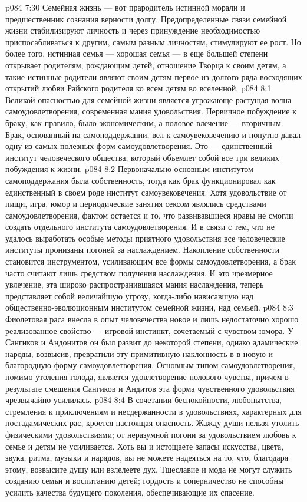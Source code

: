\vs p084 7:30 Семейная жизнь --- вот прародитель истинной морали и предшественник сознания верности долгу. Предопределенные связи семейной жизни стабилизируют личность и через принуждение необходимостью приспосабливаться к другим, самым разным личностям, стимулируют ее рост. Но более того, истинная семья --- хорошая семья --- в еще большей степени открывает родителям, рождающим детей, отношение Творца к своим детям, а такие истинные родители являют своим детям первое из долгого ряда восходящих открытий любви Райского родителя ко всем детям во вселенной.
\vs p084 8:1 Великой опасностью для семейной жизни является угрожающе растущая волна самоудовлетворения, современная мания удовольствия. Первичное побуждение к браку, как правило, было экономическим, а половое влечение --- вторичным. Брак, основанный на самоподдержании, вел к самоувековечению и попутно давал одну из самых полезных форм самоудовлетворения. Это --- единственный институт человеческого общества, который объемлет собой все три великих побуждения к жизни.
\vs p084 8:2 Первоначально основным институтом самоподдержания была собственность, тогда как брак функционировал как единственный в своем роде институт самоувековечения. Хотя удовольствие от пищи, игра, юмор и периодические занятия сексом являлись средствами самоудовлетворения, фактом остается и то, что развивавшиеся нравы не смогли создать отдельного института самоудовлетворения. И в связи с тем, что не удалось выработать особые методы приятного удовольствия все человеческие институты пронизаны погоней за наслаждением. Накопление собственности становится инструментом, усиливающим все формы самоудовлетворения, а брак часто считают лишь средством получения наслаждения. И это чрезмерное увлечение, эта широко распространившаяся мания наслаждения, теперь представляет собой величайшую угрозу, когда\hyp{}либо нависавшую над общественно\hyp{}эволюционным институтом семейной жизни, над семьей.
\vs p084 8:3 Фиолетовая раса внесла в опыт человечества новое и лишь недостаточно хорошо реализованное свойство --- игровой инстинкт, сочетаемый с чувством юмора. У Сангиков и Андонитов он был развит до некоторой степени, однако адамические народы, возвысив, превратили эту примитивную наклонность в  в новую и благородную форму самоудовлетворения. Основным типом самоудовлетворения, помимо утоления голода, является удовлетворение полового чувства, причем в результате смешения Сангиков и Андитов эта форма чувственного удовольствия чрезвычайно усилилась.
\vs p084 8:4 В сочетании беспокойности, любопытства, стремления к приключениям и несдержанности в удовольствиях, характерных для постадамических рас, кроется настоящая опасность. Жажду души нельзя утолить физическими удовольствиями; от неразумной погони за удовольствием любовь к семье и детям не усиливается. Хоть вы и истощаете запасы искусства, цвета, звука, ритма, музыки и нарядов, вы не можете надеяться на то, что, благодаря этому, возвысите душу или взлелеете дух. Тщеславие и мода не могут служить созданию семьи и воспитанию детей; гордость и соперничество не способны усилить качества будущего поколения, обеспечивающие их спасение.
